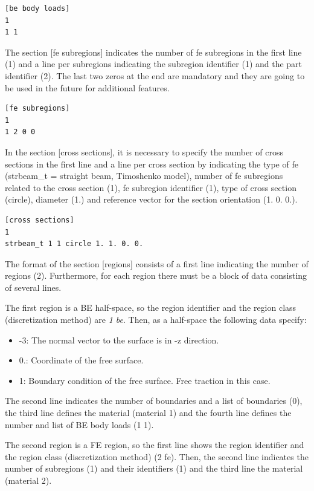 \documentclass[a4]{article}
\begin{document}
\begin{Verbatim}
[be body loads]
1
1 1
\end{Verbatim}

The section [fe subregions] indicates the number of fe subregions in the first line (1) and a line per subregions indicating the subregion identifier (1) and the part identifier (2). The last two zeros at the end are mandatory and they are going to be used in the future for additional features.

\begin{Verbatim}
[fe subregions]
1
1 2 0 0
\end{Verbatim}

In the section [cross sections], it is necessary to specify the number of cross sections in the first line and a line per cross section by indicating the type of fe (strbeam\_t = straight beam, Timoshenko model), number of fe subregions related to the cross section (1), fe subregion identifier (1), type of cross section (circle), diameter (1.) and reference vector for the section orientation (1. 0. 0.).

\begin{Verbatim}
[cross sections]
1
strbeam_t 1 1 circle 1. 1. 0. 0.
\end{Verbatim}

The format of the section [regions] consists of a first line indicating the number of regions (2). Furthermore, for each region there must be a block of data consisting of several lines. 

The first region is a BE half-space, so the region identifier and the region class (discretization method) are \emph{1 be}. Then, as a half-space the following data specify:

\begin{itemize}
	\item -3: The normal vector to the surface is in -z direction.
	\item 0.: Coordinate of the free surface.
	\item 1: Boundary condition of the free surface. Free traction in this case. 
\end{itemize}

The second line indicates the number of boundaries and a list of boundaries (0), the third line defines the material (material 1) and the fourth line defines the number and list of BE body loads (1 1).

The second region is a FE region, so the first line shows the region identifier and the region class (discretization method) (2 fe). Then, the second line indicates the number of subregions (1) and their identifiers (1) and the third line the material (material 2). 
\end{document}
